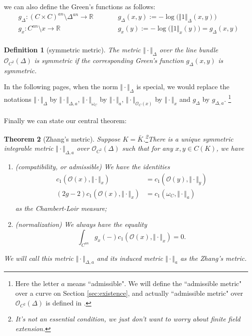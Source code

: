 \documentclass[reqno,11pt]{amsart}
\numberwithin{equation}{section}
\theoremstyle{plain}
\newtheorem{theorem}{Theorem}[section]
\newtheorem{defn}[theorem]{Definition}
\theoremstyle{plain}
\numberwithin{equation}{section}
\theoremstyle{remark}
\newcommand{\norm}[1]{\Vert{#1}\Vert}
\begin{document}
we can also define the Green's functions as follows:
\begin{equation*}
\begin{aligned}
 &g_{\Delta}:(C \times C)^{an} \setminus \Delta^{an} \longrightarrow \mathbb{R} \qquad  &&g_{\Delta}(x,y):=-\log \big(\norm{1}_{\Delta}(x,y)\big)  \\
 &g_{x}:C^{an} \setminus {x} \longrightarrow \mathbb{R} \qquad  &&g_{x}(y):=-\log \big(\norm{1}_{x}(y)\big) =g_{\Delta}(x,y) \\
\end{aligned}
\end{equation*}
\begin{defn}[symmetric metric]
The metric $\norm{\cdot}_{\Delta}$ over the line bundle $\mathcal{O}_{C^2}(\Delta)$ is symmetric if the corresponding Green's function $g_{\Delta}(x,y)$ is symmetric.
\end{defn}
In the following pages, when the norm  $\norm{\cdot}_{\Delta}$ is special, we would replace the notations $\norm{\cdot}_{\Delta}$ by $\norm{\cdot}_{\Delta,a}$, $\norm{\cdot}_{\omega_C}$ by $\norm{\cdot}_{a}$, $\norm{\cdot}_{\mathcal{O}_C(x)}$ by $\norm{\cdot}_{x}$ and $g_{\Delta}$ by $g_{\Delta,a}$. \footnote{Here the letter $a$ means ``admissible". We will define the ``admissible metric" over a curve on Section \ref{sec:existence}, and actually ``admissible metric" over $\mathcal{O}_{C^2}(\Delta)$ is defined in \cite[Appendix A.3, p79]{yuan2021arithmetic}.}
\\
\\

Finally we can state our central theorem:
\begin{theorem}[Zhang's metric]\label{thm:main}
Suppose $K=\bar{K}$.\footnote{It's not an essential condition, we just don't want to worry about finite field extension.}There is a unique symmetric integrable metric $\norm{\cdot}_{\Delta,a}$ over $\mathcal{O}_{C^2}(\Delta)$ such that for any $x,y \in C(K)$, we have
\begin{enumerate}[(1)]
\item (compatibility, or admissible) We have the identities
\begin{equation*}
\begin{aligned}
  c_1(\mathcal{O}(x),\norm{\cdot}_x)&=c_1(\mathcal{O}(y),\norm{\cdot}_y)  \\ 
  (2g-2)c_1(\mathcal{O}(x),\norm{\cdot}_x)&=c_1(\omega_C,\norm{\cdot}_a)  \\ 
\end{aligned}
\end{equation*}
as the Chambert-Loir measure;
\item (normalization) We always have the equality
$$\int_{C^{an}} g_x(-) c_1(\mathcal{O}(x),\norm{\cdot}_x) =0.$$
\end{enumerate}
We will call this metric $\norm{\cdot}_{\Delta,a}$ and its induced metric $\norm{\cdot}_{a}$ as the Zhang's metric.
\end{theorem}
\end{document}
